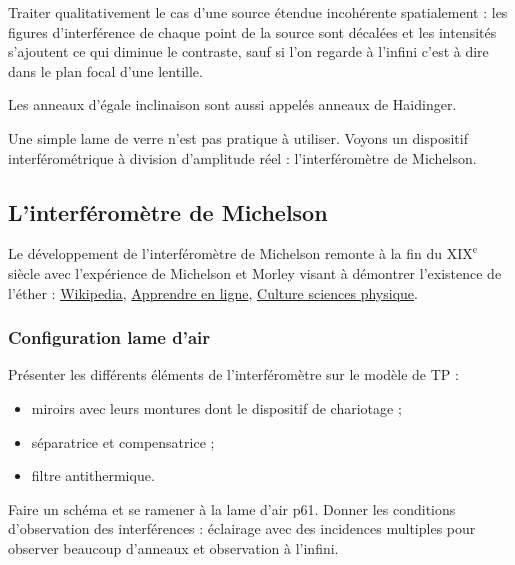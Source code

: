 Traiter qualitativement le cas d'une source étendue incohérente spatialement : les figures d'interférence de chaque point de la source sont décalées et les intensités s'ajoutent ce qui diminue le contraste, sauf si l'on regarde à l'infini c'est à dire dans le plan focal d'une lentille.

\begin{remarque}
Les anneaux d'égale inclinaison sont aussi appelés anneaux de Haidinger.
\end{remarque}

\begin{transition}
Une simple lame de verre n'est pas pratique à utiliser.
Voyons un dispositif interférométrique à division d'amplitude réel : l'interféromètre de Michelson.
\end{transition}

\subsection{L'interféromètre de Michelson}

\begin{remarque}
Le développement de l'interféromètre de Michelson remonte à la fin du $\mathrm{XIX^e}$ siècle avec l'expérience de Michelson et Morley visant à démontrer l'existence de l'éther : \href{https://fr.wikipedia.org/wiki/Exp\%C3\%A9rience_de_Michelson_et_Morley}{Wikipedia}, \href{https://owl-ge.ch/travaux-d-eleves/2007-2008/article/l-experience-de-michelson-morley}{Apprendre en ligne}, \href{http://culturesciencesphysique.ens-lyon.fr/ressource/physique-animee-Michelson-Morley.xml}{Culture sciences physique}.
\end{remarque}

\subsubsection{Configuration lame d'air}

Présenter les différents éléments de l'interféromètre sur le modèle de TP :
\begin{itemize}
\item miroirs avec leurs montures dont le dispositif de chariotage ;
\item séparatrice et compensatrice ;
\item filtre antithermique.
\end{itemize}

Faire un schéma et se ramener à la lame d'air \cite{Olivier2000} p61.
Donner les conditions d'observation des interférences : éclairage avec des incidences multiples pour observer beaucoup d'anneaux et observation à l'infini. 

